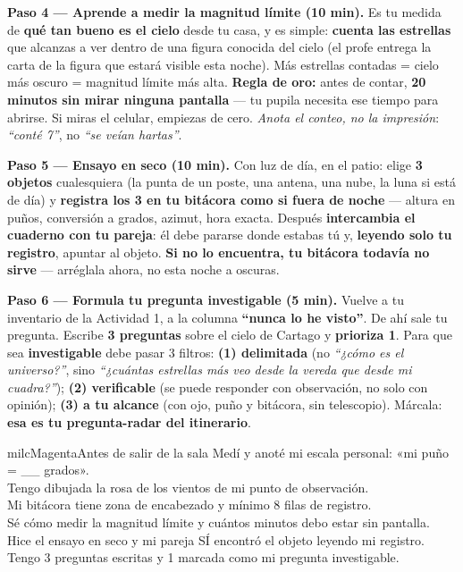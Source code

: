 \documentclass[11pt,letterpaper]{article}
\newcommand{\checkbox}{\textcolor{milcGradeDark}{\fbox{\phantom{x}}}\hspace{5pt}}
\newcommand{\milcpaso}[3]{%
\Needspace{4\baselineskip}%
\begin{tcolorbox}[enhanced,colback=white,colframe=milcLinea,arc=1.5mm,boxrule=.9pt,
  left=14mm,right=4mm,top=3mm,bottom=3mm,before skip=4pt,after skip=4pt,
  fontupper=\RaggedRight,
  overlay={\node[anchor=north west,circle,fill=#2,text=white,inner sep=0pt,
    minimum size=7.4mm,font=\sffamily\bfseries\small]
    at ([xshift=3.6mm,yshift=-3.2mm]frame.north west) {#1};}]
#3
\end{tcolorbox}}
\begin{document}
\milcpaso{4}{milcMagenta}{\textbf{Paso 4 --- Aprende a medir la magnitud límite (10 min).} Es tu medida de \textbf{qué tan bueno es el cielo} desde tu casa, y es simple: \textbf{cuenta las estrellas} que alcanzas a ver dentro de una figura conocida del cielo (el profe entrega la carta de la figura que estará visible esta noche). Más estrellas contadas = cielo más oscuro = magnitud límite más alta. \textbf{Regla de oro:} antes de contar, \textbf{20 minutos sin mirar ninguna pantalla} --- tu pupila necesita ese tiempo para abrirse. Si miras el celular, empiezas de cero. \emph{Anota el conteo, no la impresión}: \emph{``conté 7''}, no \emph{``se veían hartas''}.}
\milcpaso{5}{milcMagenta}{\textbf{Paso 5 --- Ensayo en seco (10 min).} Con luz de día, en el patio: elige \textbf{3 objetos} cualesquiera (la punta de un poste, una antena, una nube, la luna si está de día) y \textbf{registra los 3 en tu bitácora como si fuera de noche} --- altura en puños, conversión a grados, azimut, hora exacta. Después \textbf{intercambia el cuaderno con tu pareja}: él debe pararse donde estabas tú y, \textbf{leyendo solo tu registro}, apuntar al objeto. \textbf{Si no lo encuentra, tu bitácora todavía no sirve} --- arréglala ahora, no esta noche a oscuras.}
\milcpaso{6}{milcMagenta}{\textbf{Paso 6 --- Formula tu pregunta investigable (5 min).} Vuelve a tu inventario de la Actividad 1, a la columna \textbf{``nunca lo he visto''}. De ahí sale tu pregunta. Escribe \textbf{3 preguntas} sobre el cielo de Cartago y \textbf{prioriza 1}. Para que sea \textbf{investigable} debe pasar 3 filtros: \textbf{(1) delimitada} (no \emph{``¿cómo es el universo?''}, sino \emph{``¿cuántas estrellas más veo desde la vereda que desde mi cuadra?''}); \textbf{(2) verificable} (se puede responder con observación, no solo con opinión); \textbf{(3) a tu alcance} (con ojo, puño y bitácora, sin telescopio). Márcala: \textbf{esa es tu pregunta-radar del itinerario}.}

\begin{drawbox}{milcMagenta}{Antes de salir de la sala}
\checkbox Medí y anoté mi escala personal: «mi puño = \_\_ grados». \\[1mm]
\checkbox Tengo dibujada la rosa de los vientos de mi punto de observación. \\[1mm]
\checkbox Mi bitácora tiene zona de encabezado y mínimo 8 filas de registro. \\[1mm]
\checkbox Sé cómo medir la magnitud límite y cuántos minutos debo estar sin pantalla. \\[1mm]
\checkbox Hice el ensayo en seco y mi pareja SÍ encontró el objeto leyendo mi registro. \\[1mm]
\checkbox Tengo 3 preguntas escritas y 1 marcada como mi pregunta investigable.
\end{drawbox}
\end{document}
